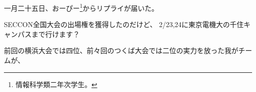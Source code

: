 一月二十五日、おーぴー\footnote{情報科学類二年次学生。}からリプライが届いた。

\begin{screen}
	SECCON全国大会の出場権を獲得したのだけど、
	2/23,24に東京電機大の千住キャンパスまで行けます？
\end{screen}

前回の横浜大会では四位、前々回のつくば大会では二位の実力を放った我がチームが、

